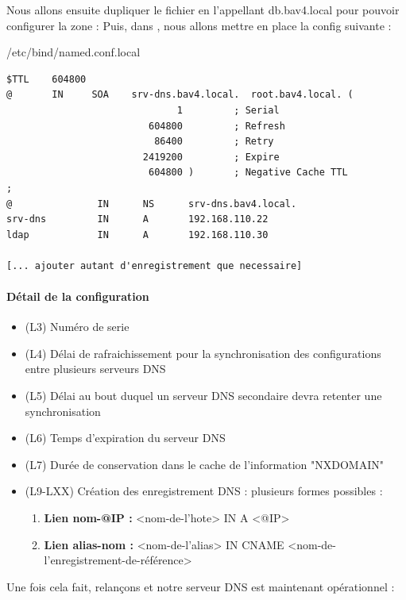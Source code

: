 \documentclass{article}
\begin{document}
Nous allons ensuite dupliquer le fichier  en l’appellant db.bav4.local pour pouvoir configurer la zone : 
Puis, dans , nous allons mettre en place la config suivante :
\label{subsubsec:confzonedns}
\begin{configbox}{/etc/bind/named.conf.local}
\begin{lstlisting}
$TTL    604800
@       IN     SOA    srv-dns.bav4.local.  root.bav4.local. (
                              1         ; Serial
                         604800         ; Refresh
                          86400         ; Retry
                        2419200         ; Expire
                         604800 )       ; Negative Cache TTL
;
@               IN      NS      srv-dns.bav4.local.
srv-dns         IN      A       192.168.110.22
ldap			IN		A		192.168.110.30

[... ajouter autant d'enregistrement que necessaire]
\end{lstlisting}
\end{configbox}
\paragraph{Détail de la configuration}
\begin{itemize}
	\item (L3) Numéro de serie
	\item (L4) Délai de rafraichissement pour la synchronisation des configurations entre plusieurs serveurs DNS
	\item (L5) Délai au bout duquel un serveur DNS secondaire devra retenter une synchronisation
	\item (L6) Temps d'expiration du serveur DNS
	\item (L7) Durée de conservation dans le cache de l'information "NXDOMAIN"
	\item (L9-LXX) Création des enregistrement DNS : plusieurs formes possibles :
	\begin{enumerate}
		\item \textbf{Lien nom-@IP :}	<nom-de-l'hote>   	IN	A		<@IP>
		\item \textbf{Lien alias-nom :}	<nom-de-l'alias> 	IN	CNAME 	<nom-de-l'enregistrement-de-référence>
	\end{enumerate}		  
\end{itemize}

Une fois cela fait, relançons  et notre serveur DNS est maintenant opérationnel :
\end{document}
